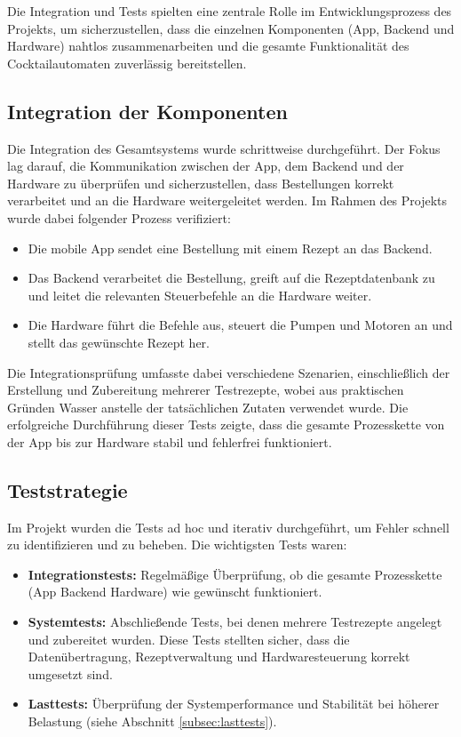 Die Integration und Tests spielten eine zentrale Rolle im Entwicklungsprozess des Projekts, um sicherzustellen, dass die einzelnen Komponenten (App, Backend und Hardware) nahtlos zusammenarbeiten und die gesamte Funktionalität des Cocktailautomaten zuverlässig bereitstellen.

\subsection{Integration der Komponenten}

Die Integration des Gesamtsystems wurde schrittweise durchgeführt. Der Fokus lag darauf, die Kommunikation zwischen der App, dem Backend und der Hardware zu überprüfen und sicherzustellen, dass Bestellungen korrekt verarbeitet und an die Hardware weitergeleitet werden. Im Rahmen des Projekts wurde dabei folgender Prozess verifiziert:

\begin{itemize}
  \item Die mobile App sendet eine Bestellung mit einem Rezept an das Backend.
  \item Das Backend verarbeitet die Bestellung, greift auf die Rezeptdatenbank zu und leitet die relevanten Steuerbefehle an die Hardware weiter.
  \item Die Hardware führt die Befehle aus, steuert die Pumpen und Motoren an und stellt das gewünschte Rezept her.
\end{itemize}

Die Integrationsprüfung umfasste dabei verschiedene Szenarien, einschließlich der Erstellung und Zubereitung mehrerer Testrezepte, wobei aus praktischen Gründen Wasser anstelle der tatsächlichen Zutaten verwendet wurde. Die erfolgreiche Durchführung dieser Tests zeigte, dass die gesamte Prozesskette von der App bis zur Hardware stabil und fehlerfrei funktioniert.

\subsection{Teststrategie}

Im Projekt wurden die Tests ad hoc und iterativ durchgeführt, um Fehler schnell zu identifizieren und zu beheben. Die wichtigsten Tests waren:

\begin{itemize}
  \item \textbf{Integrationstests:} Regelmäßige Überprüfung, ob die gesamte Prozesskette (App \textrightarrow{} Backend \textrightarrow{} Hardware) wie gewünscht funktioniert.
  \item \textbf{Systemtests:} Abschließende Tests, bei denen mehrere Testrezepte angelegt und zubereitet wurden. Diese Tests stellten sicher, dass die Datenübertragung, Rezeptverwaltung und Hardwaresteuerung korrekt umgesetzt sind.
  \item \textbf{Lasttests:} Überprüfung der Systemperformance und Stabilität bei höherer Belastung (siehe Abschnitt \ref{subsec:lasttests}).
\end{itemize}

